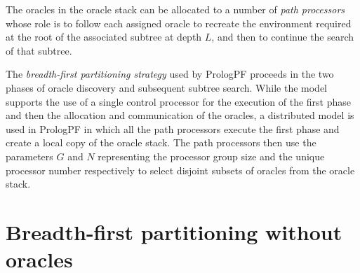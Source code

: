The oracles in the oracle stack can be allocated to a number of
\textit{path processors} whose role is to follow each assigned oracle
to recreate the environment required at the root of the associated
subtree at depth $L$, and then to continue the search of that subtree.

The \textit{breadth-first partitioning strategy} used by PrologPF proceeds
in the two phases of oracle discovery and subsequent subtree search.
While the model supports the use of a single control processor for
the execution of the first phase and then the allocation 
and communication of the oracles,
a distributed model is used in PrologPF in which all the path
processors execute the first phase and create a local copy of the
oracle stack.  The path processors then use the parameters $G$ and
$N$ representing the processor group size and the unique processor
number respectively to select disjoint subsets of oracles from the oracle stack.

\section{Breadth-first partitioning without oracles} %
\label{no_orcs}

